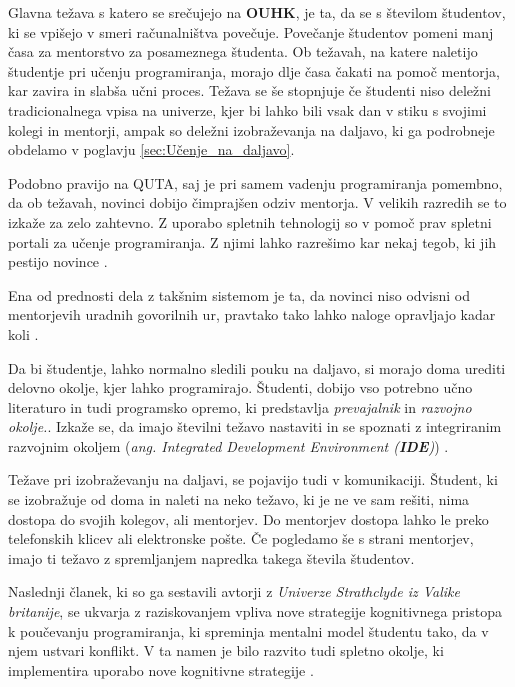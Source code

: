 Glavna težava s katero se srečujejo na \textbf{OUHK}, je ta, da se s
številom študentov, ki se vpišejo v smeri računalništva
povečuje. Povečanje študentov pomeni manj časa za mentorstvo za
posameznega študenta. Ob težavah, na katere naletijo študentje pri
učenju programiranja, morajo dlje časa čakati na pomoč mentorja, kar
zavira in slabša učni proces. Težava se še stopnjuje če študenti niso
deležni tradicionalnega vpisa na univerze, kjer bi lahko bili vsak dan
v stiku s svojimi kolegi in mentorji, ampak so deležni izobraževanja
na daljavo, ki ga podrobneje obdelamo v poglavju
\ref{sec:Učenje_na_daljavo}.

Podobno pravijo na QUTA, saj je pri samem vadenju programiranja
pomembno, da ob težavah, novinci dobijo čimprajšen odziv mentorja. V
velikih razredih se to izkaže za zelo zahtevno. Z uporabo spletnih
tehnologij so v pomoč prav spletni portali za učenje programiranja. Z
njimi lahko razrešimo kar nekaj tegob, ki jih pestijo novince
\cite{thesisAWebP}.

Ena od prednosti dela z takšnim sistemom je ta, da novinci niso odvisni
od mentorjevih uradnih govorilnih ur, pravtako tako lahko naloge
opravljajo kadar koli \cite{thesisAWebP}.


Da bi študentje, lahko normalno sledili pouku na daljavo, si morajo
doma urediti delovno okolje, kjer lahko programirajo. Študenti,
dobijo vso potrebno učno literaturo in tudi programsko opremo, ki
predstavlja \emph{prevajalnik} in \emph{razvojno okolje.}. Izkaže se,
da imajo številni težavo nastaviti in se spoznati z integriranim
razvojnim okoljem (\emph{ang. Integrated Development Environment
  (\textbf{IDE})}) \cite{ITaLCP_DistanceEdu}.

Težave pri izobraževanju na daljavi, se pojavijo tudi v
komunikaciji. Študent, ki se izobražuje od doma in naleti na neko
težavo, ki je ne ve sam rešiti, nima dostopa do svojih kolegov, ali
mentorjev. Do mentorjev dostopa lahko le preko telefonskih klicev ali
elektronske pošte. Če pogledamo še s strani mentorjev, imajo ti težavo
z spremljanjem napredka takega števila študentov.


Naslednji članek, ki so ga sestavili avtorji z \emph{Univerze
  Strathclyde iz Valike britanije}, se ukvarja z raziskovanjem vpliva
nove strategije kognitivnega pristopa k poučevanju programiranja, ki
spreminja mentalni model študentu tako, da v njem ustvari konflikt. V
ta namen je bilo razvito tudi spletno okolje, ki implementira uporabo
nove kognitivne strategije \cite{mentalModels}.

